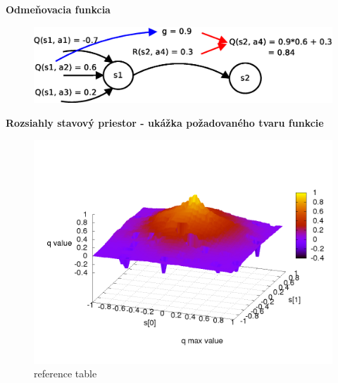 \documentclass[xcolor=dvipsnames]{beamer}
\begin{document}
\begin{frame}{\bf Odmeňovacia funkcia}

\begin{figure}[!htb]
\includegraphics[scale=.4]{../diagrams/q_learning_detail.eps}
\end{figure}

\end{frame}

\begin{frame}{\bf Rozsiahly stavový priestor - ukážka požadovaného tvaru funkcie}

\begin{figure}[!htb]
\centering
\includegraphics[scale=.39]{../../results_q_learning/map_1/function_type_0/iterations_10/q_learning_result.png}
\caption{reference table}
\end{figure}

\end{frame}
\end{document}

